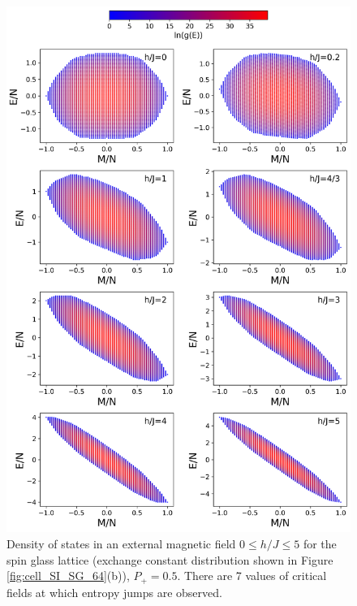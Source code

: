 \documentclass[preprint,12pt]{elsarticle}
\begin{document}
	\begin{figure}[H]
		\centering
		\includegraphics[width=1\linewidth]{pictures/HDOS_SG_64_J0.png}
		\caption{Density of states in an external magnetic field $0\leq h/J \leq 5$ for the spin glass lattice (exchange constant distribution shown in Figure \ref{fig:cell_SI_SG_64}(b)), $P_+ = 0.5$. There are 7 values of critical fields at which entropy jumps are observed.}
		\label{fig:HDOS_glass}
	\end{figure}
	
\end{document}
